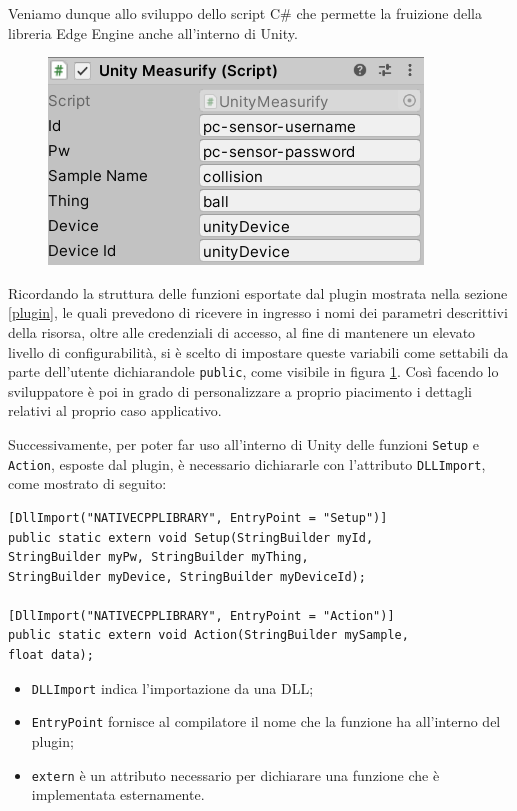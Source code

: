 Veniamo dunque allo sviluppo dello script C\# che permette la fruizione della libreria Edge Engine anche all'interno di Unity.  

\begin{figure}
	\centering
	\includegraphics[scale=0.85]{pics/unityscriptvars}
	\caption{}
	\label{unityscriptvars}
\end{figure}

Ricordando la struttura delle funzioni esportate dal plugin mostrata nella sezione \ref{plugin}, le quali prevedono di ricevere in ingresso i nomi dei parametri descrittivi della risorsa, oltre alle credenziali di accesso, al fine di mantenere un elevato livello di configurabilità, si è scelto di impostare queste variabili come settabili da parte dell'utente dichiarandole \texttt{public}, come visibile in figura \ref{unityscriptvars}. Così facendo lo sviluppatore è poi in grado di personalizzare a proprio piacimento i dettagli relativi al proprio caso applicativo.

Successivamente, per poter far uso all'interno di Unity delle funzioni \texttt{Setup} e \texttt{Action}, esposte dal plugin, è necessario dichiararle con l’attributo \texttt{DLLImport}, come mostrato di seguito:

\begin{verbatim}
[DllImport("NATIVECPPLIBRARY", EntryPoint = "Setup")]
public static extern void Setup(StringBuilder myId, 
StringBuilder myPw, StringBuilder myThing, 
StringBuilder myDevice, StringBuilder myDeviceId);

[DllImport("NATIVECPPLIBRARY", EntryPoint = "Action")]
public static extern void Action(StringBuilder mySample, 
float data);
\end{verbatim}

\begin{itemize}
	\item \texttt{DLLImport} indica l'importazione da una DLL;
	\item \texttt{EntryPoint} fornisce al compilatore il nome che la funzione ha all'interno del plugin;
	\item \texttt{extern} è un attributo necessario per dichiarare una funzione che è implementata esternamente.
\end{itemize}

